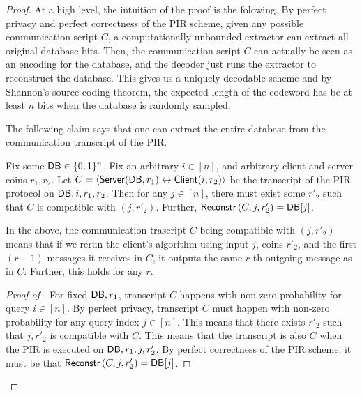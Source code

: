 \begin{proof}


At a high level, the intuition of the proof is the folowing. 
By perfect privacy and perfect correctness of the PIR scheme, given any possible communication script $C$, a computationally unbounded extractor can extract all original database bits. Then, the communication script $C$ can actually be seen as an encoding for the database, and the decoder just runs the extractor to reconstruct the database. This gives us a uniquely decodable scheme and by Shannon's source coding theorem, the expected length of the codeword has be at least $n$ bits when
the database is randomly sampled. 

The following claim says that one can extract the entire database from the 
communication transcript of the PIR.
\begin{claim}
\label{clm:extract}
Fix some ${\sf DB} \in \{0, 1\}^n$.  
Fix an arbitrary $i \in [n]$, and arbitrary client and server coins $r_1, r_2$.
Let $C = 
\langle {\sf Server}({\sf DB}, r_1) \leftrightarrow {\sf Client}(i, r_2) \rangle$
be the transcript of the PIR protocol on ${\sf DB}, i, r_1, r_2$.
Then for any $j \in [n]$, there must 
exist some $r'_2$ such that $C$ is compatible with $(j, r'_2)$.
Further, 
${\sf Reconstr}\left(C, j, r'_2\right) = {\sf DB}[j]$.
\end{claim}
In the above, the communication trascript $C$ being compatible with $(j, r'_2)$
means that if we rerun the client's algorithm using input $j$, coins  
$r'_2$, and the first $(r-1)$ messages it receives in $C$,
it outputs the same $r$-th outgoing message as in $C$. 
Further, this holds for any $r$.


\begin{proof}[Proof of ]
For fixed ${\sf DB}, r_1$, 
transcript $C$ happens with non-zero probability
for query $i \in [n]$. 
By perfect privacy, transcript $C$ must happen
with non-zero probability for any query index $j \in [n]$.
This means that there exists 
$r'_2$ such that $j, r'_2$ is compatible with $C$.
This means that the transcript is also $C$ when the PIR
is executed on ${\sf DB}, r_1, j, r'_2$.
By perfect correctness of the PIR scheme, it must be 
that ${\sf Reconstr}\left(C, j, r'_2\right) = {\sf DB}[j]$.
\end{proof}


\end{proof}
